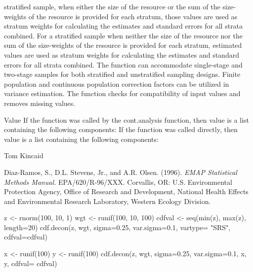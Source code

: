 \begin{Details}
stratified sample, when either the size of the resource or the sum of the size-
weights of the resource is provided for each stratum, those values are used as 
stratum weights for calculating the estimates and standard  errors for all 
strata combined.  For a stratified sample when neither the size of the resource
nor the sum of the size-weights of the resource is provided for each stratum, 
estimated values are used as stratum weights for calculating the estimates and 
standard errors for all strata combined.   The function can accommodate 
single-stage and two-stage samples for both stratified and unstratified 
sampling designs.  Finite population and continuous population correction 
factors can be utilized in variance estimation.  The function checks for 
compatibility of input values and removes missing values.
\end{Details}
\begin{Section}{Value}
If the function was called by the cont.analysis function, then value is a list
containing the following components:
If the function was called directly, then value is a list containing the
following components:
\end{Section}
\begin{Author}\relax
Tom Kincaid 
\end{Author}
\begin{References}\relax
Diaz-Ramos, S., D.L. Stevens, Jr., and A.R. Olsen. (1996).  \emph{EMAP
Statistical Methods Manual.} EPA/620/R-96/XXX.  Corvallis, OR: U.S.
Environmental Protection Agency, Office of Research and Development, National
Health Effects and Environmental Research Laboratory, Western Ecology
Division.
\end{References}
\begin{Examples}
\begin{ExampleCode}
z <- rnorm(100, 10, 1)
wgt <- runif(100, 10, 100)
cdfval <- seq(min(z), max(z), length=20)
cdf.decon(z, wgt, sigma=0.25, var.sigma=0.1, vartype=
  "SRS", cdfval=cdfval)

x <- runif(100)
y <- runif(100)
cdf.decon(z, wgt, sigma=0.25, var.sigma=0.1, x, y, cdfval=
  cdfval)
\end{ExampleCode}
\end{Examples}

